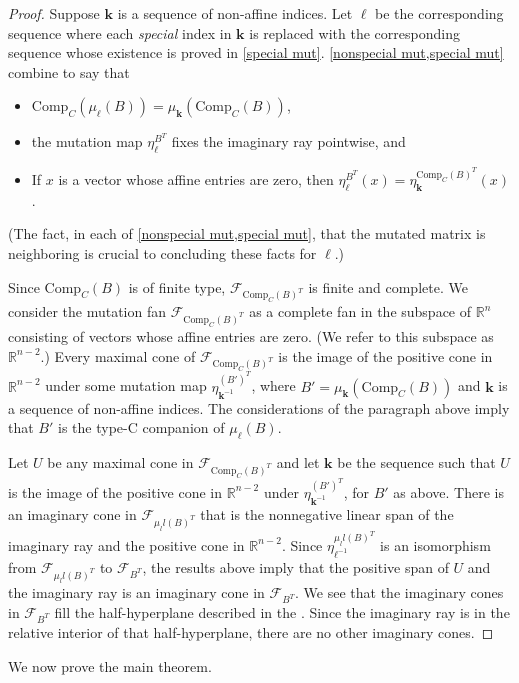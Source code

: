 \documentclass{amsart}
\theoremstyle{definition}
\theoremstyle{remark}
\numberwithin{equation}{section}
\newcommand{\reals}{\mathbb R}
\newcommand{\F}{{\mathcal F}}
\newcommand{\0}{{\mathbf{0}}}
\newcommand{\Comp}{\mathrm{Comp}_C}
\newcommand{\kk}{\mathbf{k}}
\renewcommand{\ll}{{\boldsymbol\ell}}
\begin{document}
\begin{proof}
Suppose $\kk$ is a sequence of non-affine indices.  
Let $\ll$ be the corresponding sequence where each \emph{special} index in $\kk$ is replaced with the corresponding sequence whose existence is proved in \cref{special mut}.
\cref{nonspecial mut,special mut} combine to say that 
\begin{itemize}
\item
$\Comp(\mu_\ll(B))=\mu_\kk(\Comp(B))$,
\item
the mutation map $\eta^{B^T}_\ll$ fixes the imaginary ray pointwise, and 
\item
If $x$ is a vector whose affine entries are zero, then $\eta^{B^T}_\ll(x)=\eta^{\Comp(B)^T}_\kk(x)$.
\end{itemize}
(The fact, in each of \cref{nonspecial mut,special mut}, that the mutated matrix is neighboring is crucial to concluding these facts for $\ll$.)

Since $\Comp(B)$ is of finite type, $\F_{\Comp(B)^T}$ is finite and complete.
We consider the mutation fan $\F_{\Comp(B)^T}$ as a complete fan in the subspace of $\reals^n$ consisting of vectors whose affine entries are zero. 
(We refer to this subspace as $\reals^{n-2}$.)
Every maximal cone of $\F_{\Comp(B)^T}$ is the image of the positive cone in $\reals^{n-2}$ under some mutation map $\eta^{(B')^T}_{\kk^{-1}}$, where $B'=\mu_\kk(\Comp(B))$ and $\kk$ is a sequence of non-affine indices.
The considerations of the paragraph above imply that $B'$ is the type-C companion of $\mu_\ll(B)$.

Let $U$ be any maximal cone in $\F_{\Comp(B)^T}$ and let $\kk$ be the sequence such that $U$ is the image of the positive cone in $\reals^{n-2}$ under $\eta^{(B')^T}_{\kk^{-1}}$, for $B'$ as above.
There is an imaginary cone in $\F_{\mu_ll(B)^T}$ that is the nonnegative linear span of the imaginary ray and the positive cone in $\reals^{n-2}$.
Since $\eta^{\mu_ll(B)^T}_{\ell^{-1}}$ is an isomorphism from $\F_{\mu_ll(B)^T}$ to $\F_{B^T}$, the results above imply that the positive span of $U$ and the imaginary ray is an imaginary cone in $\F_{B^T}$.
We see that the imaginary cones in $\F_{B^T}$ fill the half-hyperplane described in the .
Since the imaginary ray is in the relative interior of that half-hyperplane, there are no other imaginary cones.
\end{proof}

We now prove the main theorem.
\end{document}

